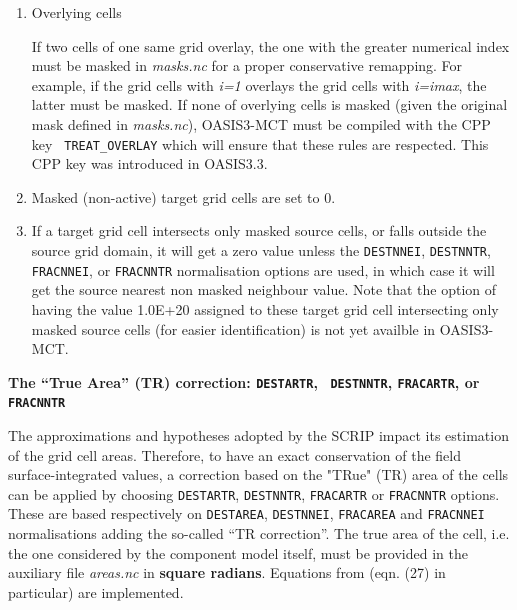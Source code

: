 \begin{itemize}
\begin{enumerate}
  \item Overlying cells
  
  If two cells of one same grid overlay, the one with
    the greater numerical index must be masked in {\it
      masks.nc} for a proper conservative remapping.  For example, 
     if the grid cells with {\it i=1} overlays the grid cells with {\it i=imax}, the latter must
    be masked.  If none of overlying cells is masked (given the
    original mask defined in {\it
      masks.nc}), OASIS3-MCT must be compiled with the CPP key {\tt
      TREAT\_OVERLAY} which will ensure that these rules are
    respected. This CPP key was introduced in OASIS3.3.
    
  \item Masked (non-active) target grid cells are set to 0.
    
  \item If a target grid cell intersects only masked source cells, or falls outside the source grid domain, it
    will get a zero value unless the {\tt DESTNNEI}, {\tt DESTNNTR}, {\tt FRACNNEI}, or {\tt FRACNNTR}
    normalisation options are used, in which case it will get the source
    nearest non masked neighbour value. Note that the option of
      having the value 1.0E+20 assigned to these target grid cell
      intersecting only masked source cells (for easier
      identification) is not yet availble in OASIS3-MCT.
    

    
  \end{enumerate}
  
  {\bf The ``True Area'' (TR) correction: {\tt \bf DESTARTR}, {\tt \bf
      DESTNNTR}, {\tt \bf FRACARTR}, or {\tt \bf FRACNNTR}}
  
The approximations and hypotheses adopted by the SCRIP impact its estimation of the grid cell areas. Therefore, to have an exact conservation of the field surface-integrated values, a correction based on the "TRue" (TR) area of the cells can be applied by choosing {\tt DESTARTR}, {\tt DESTNNTR}, {\tt FRACARTR} or {\tt FRACNNTR} options. These are based respectively on {\tt DESTAREA}, {\tt DESTNNEI}, {\tt FRACAREA} and {\tt FRACNNEI} normalisations adding the so-called ``TR correction''. The true area of the cell, i.e. the one considered by the component model itself, must be provided in the auxiliary file {\it areas.nc} in {\bf square radians}. Equations from \cite{chavas 13} (eqn. (27) in particular) are implemented. 


\end{itemize}
